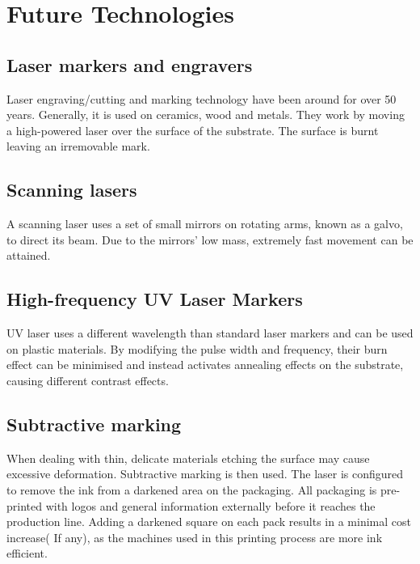 \chapter{Future Technologies}
\pagestyle{fancy}

\section{Laser markers and engravers}
Laser engraving/cutting and marking technology have been around for over 50 years. Generally, it is used on ceramics, wood and metals. They work by moving a high-powered laser over the surface of the substrate. The surface is burnt leaving an irremovable mark.

\section{Scanning lasers}
A scanning laser uses a set of small mirrors on rotating arms, known as a galvo, to direct its beam. Due to the mirrors' low mass, extremely fast movement can be attained. 

\section{High-frequency UV Laser Markers}
UV laser uses a different wavelength than standard laser markers and can be used on plastic materials. By modifying the pulse width and frequency, their burn effect can be minimised and instead activates annealing effects on the substrate, causing different contrast effects.

\section{Subtractive marking}
When dealing with thin, delicate materials etching the surface may cause excessive deformation. Subtractive marking is then used. The laser is configured to remove the ink from a darkened area on the packaging. All packaging is pre-printed with logos and general information externally before it reaches the production line. 
Adding a darkened square on each pack results in a minimal cost increase( If any), as the machines used in this printing process are more ink efficient.








